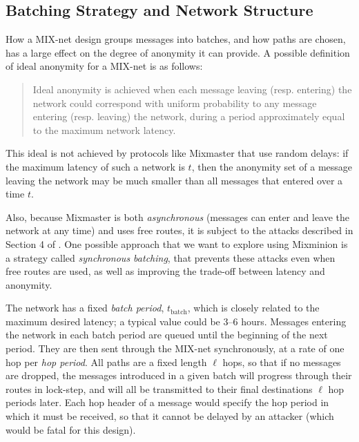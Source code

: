 \documentclass{llncs}
\begin{document}
\subsection{Batching Strategy and Network Structure}
\label{subsec:batching}


How a MIX-net design groups messages into batches, and how paths are
chosen, has a large effect on the degree of anonymity it can provide.
A possible definition of ideal anonymity for a MIX-net is as follows:

\begin{quote}
Ideal anonymity is achieved when each message leaving (resp. entering)
the network could correspond with uniform probability to any message
entering (resp. leaving) the network, during a period approximately
equal to the maximum network latency.
\end{quote}

This ideal is not achieved by protocols like Mixmaster that use random
delays: if the maximum latency of such a network is $t$, then the
anonymity set of a message leaving the network may be much smaller
than all messages that entered over a time $t$.

Also, because Mixmaster is both {\em asynchronous} (messages can enter and
leave the network at any time) and uses free routes, it is subject to
the attacks described in Section 4 of \cite{disad-free-routes}.
One possible approach that we want to explore using Mixminion is a
strategy called {\em synchronous batching}, that prevents these
attacks even when free routes are used, as well as improving the
trade-off between latency and anonymity.

The network has a fixed {\em batch period}, $t_\mathrm{batch}$, which is closely
related to the maximum desired latency; a typical value could be 3--6 hours.
Messages entering the network in each batch period are queued until
the beginning of the next period. They are then sent through the MIX-net
synchronously, at a rate of one hop per {\em hop period}. All paths are
a fixed length $\ell$ hops, so that if no messages are dropped, the messages
introduced in a given batch will progress through their routes in
lock-step, and will all be transmitted to their final destinations $\ell$
hop periods later. Each hop header of a message would specify the hop
period in which it must be received, so that it cannot be delayed by an
attacker (which would be fatal for this design).
\end{document}
